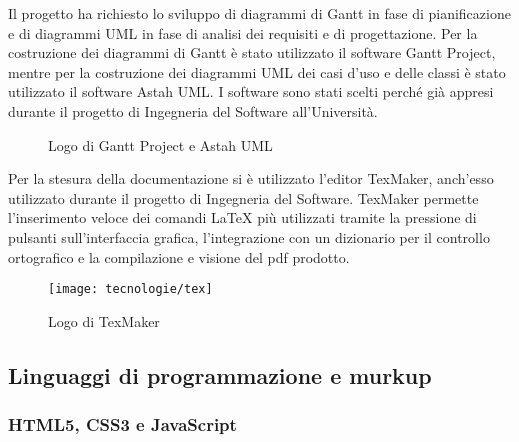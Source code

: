 Il progetto ha richiesto lo sviluppo di diagrammi di Gantt in fase di pianificazione e di diagrammi UML in fase di analisi dei requisiti e di progettazione. Per la costruzione dei diagrammi di Gantt è stato utilizzato il software Gantt Project, mentre per la costruzione dei diagrammi UML dei casi d'uso e delle classi è stato utilizzato il software Astah UML. I software sono stati scelti perché già appresi durante il progetto di Ingegneria del Software all'Università.

\begin{figure}[!h] 
    \centering 
    \caption{Logo di Gantt Project e Astah UML}
\end{figure}

Per la stesura della documentazione si è utilizzato l'editor TexMaker, anch'esso utilizzato durante il progetto di Ingegneria del Software. TexMaker permette l'inserimento veloce dei comandi \LaTeX{} più utilizzati tramite la pressione di pulsanti sull'interfaccia grafica, l'integrazione con un dizionario per il controllo ortografico e la compilazione e visione del pdf prodotto.

\begin{figure}[!h] 
    \centering 
    \texttt{[image: tecnologie/tex]} 
    \caption{Logo di TexMaker}
\end{figure}

\subsection{Linguaggi di programmazione e murkup}

\subsubsection{HTML5, CSS3 e JavaScript}

